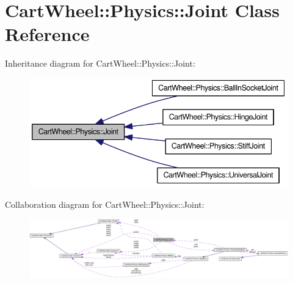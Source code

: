 \hypertarget{classCartWheel_1_1Physics_1_1Joint}{
\section{CartWheel::Physics::Joint Class Reference}
\label{classCartWheel_1_1Physics_1_1Joint}
}


Inheritance diagram for CartWheel::Physics::Joint:\nopagebreak
\begin{figure}[H]
\begin{center}
\leavevmode
\includegraphics[width=374pt]{classCartWheel_1_1Physics_1_1Joint__inherit__graph}
\end{center}
\end{figure}


Collaboration diagram for CartWheel::Physics::Joint:\nopagebreak
\begin{figure}[H]
\begin{center}
\leavevmode
\includegraphics[width=400pt]{classCartWheel_1_1Physics_1_1Joint__coll__graph}
\end{center}
\end{figure}
